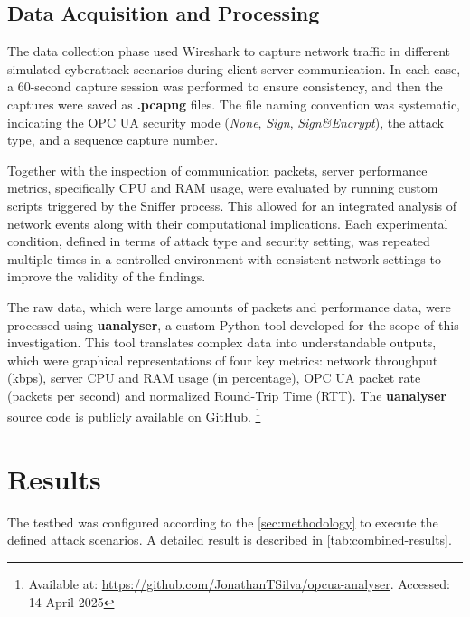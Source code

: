 \documentclass[pdflatex,sn-mathphys-num,iicol]{sn-jnl}%
\begin{document}
\subsection{Data Acquisition and Processing}

The data collection phase used Wireshark to capture network traffic in different simulated cyberattack scenarios during client-server communication. In each case, a 60-second capture session was performed to ensure consistency, and then the captures were saved as \textbf{.pcapng} files. The file naming convention was systematic, indicating the OPC UA security mode (\textit{None}, \textit{Sign}, \textit{Sign\&Encrypt}), the attack type, and a sequence capture number.

Together with the inspection of communication packets, server performance metrics, specifically CPU and RAM usage, were evaluated by running custom scripts triggered by the Sniffer process. This allowed for an integrated analysis of network events along with their computational implications. Each experimental condition, defined in terms of attack type and security setting, was repeated multiple times in a controlled environment with consistent network settings to improve the validity of the findings.

The raw data, which were large amounts of packets and performance data, were processed using \textbf{uanalyser}, a custom Python tool developed for the scope of this investigation. This tool translates complex data into understandable outputs, which were graphical representations of four key metrics: network throughput (kbps), server CPU and RAM usage (in percentage), OPC UA packet rate (packets per second) and normalized Round-Trip Time (RTT). The \textbf{uanalyser} source code is publicly available on GitHub. \footnote{\label{github_note}Available at: \url{https://github.com/JonathanTSilva/opcua-analyser}. Accessed: 14 April 2025}

\section{Results}\label{sec:results}

The testbed was configured according to the \autoref{sec:methodology} to execute the defined attack scenarios.  A detailed result is described in \autoref{tab:combined-results}. 
\end{document}
